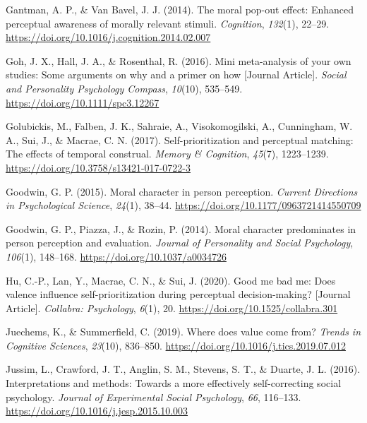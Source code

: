 \documentclass[
  man]{apa6}
\newlength{\cslhangindent}
\newlength{\cslentryspacingunit} %
\newenvironment{CSLReferences}[2] %
 {%
  \setlength{\parindent}{0pt}
  \ifodd #1
  \let\oldpar\par
  \def\par{\hangindent=\cslhangindent\oldpar}
  \fi
  \setlength{\parskip}{#2\cslentryspacingunit}
 }%
 {}
\begin{document}
\begin{CSLReferences}{1}{0}
\leavevmode{}%
Gantman, A. P., \& Van Bavel, J. J. (2014). The moral pop-out effect: Enhanced perceptual awareness of morally relevant stimuli. \emph{Cognition}, \emph{132}(1), 22--29. \url{https://doi.org/10.1016/j.cognition.2014.02.007}

\leavevmode{}%
Goh, J. X., Hall, J. A., \& Rosenthal, R. (2016). Mini meta-analysis of your own studies: Some arguments on why and a primer on how {[}Journal Article{]}. \emph{Social and Personality Psychology Compass}, \emph{10}(10), 535--549. \url{https://doi.org/10.1111/spc3.12267}

\leavevmode{}%
Golubickis, M., Falben, J. K., Sahraie, A., Visokomogilski, A., Cunningham, W. A., Sui, J., \& Macrae, C. N. (2017). Self-prioritization and perceptual matching: The effects of temporal construal. \emph{Memory \& Cognition}, \emph{45}(7), 1223--1239. \url{https://doi.org/10.3758/s13421-017-0722-3}

\leavevmode{}%
Goodwin, G. P. (2015). Moral character in person perception. \emph{Current Directions in Psychological Science}, \emph{24}(1), 38--44. \url{https://doi.org/10.1177/0963721414550709}

\leavevmode{}%
Goodwin, G. P., Piazza, J., \& Rozin, P. (2014). Moral character predominates in person perception and evaluation. \emph{Journal of Personality and Social Psychology}, \emph{106}(1), 148--168. \url{https://doi.org/10.1037/a0034726}

\leavevmode{}%
Hu, C.-P., Lan, Y., Macrae, C. N., \& Sui, J. (2020). Good me bad me: Does valence influence self-prioritization during perceptual decision-making? {[}Journal Article{]}. \emph{Collabra: Psychology}, \emph{6}(1), 20. \url{https://doi.org/10.1525/collabra.301}

\leavevmode{}%
Juechems, K., \& Summerfield, C. (2019). Where does value come from? \emph{Trends in Cognitive Sciences}, \emph{23}(10), 836--850. \url{https://doi.org/10.1016/j.tics.2019.07.012}

\leavevmode{}%
Jussim, L., Crawford, J. T., Anglin, S. M., Stevens, S. T., \& Duarte, J. L. (2016). Interpretations and methods: {Towards} a more effectively self-correcting social psychology. \emph{Journal of Experimental Social Psychology}, \emph{66}, 116--133. \url{https://doi.org/10.1016/j.jesp.2015.10.003}


\end{CSLReferences}
\end{document}
